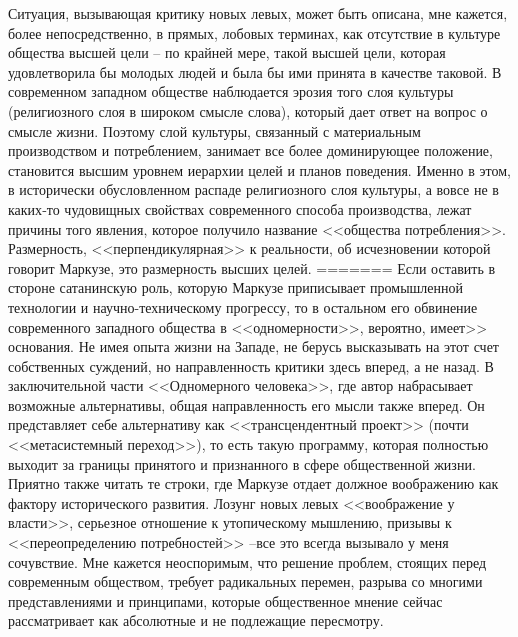 \documentclass{book}
\begin{document}
{Ситуация, вызывающая критику новых левых, может быть описана, мне кажется, более непосредственно, в прямых, лобо­вых терминах, как отсутствие в культуре общества высшей це­ли -- по крайней мере, такой высшей цели, которая удовлетво­рила бы молодых людей и была бы ими принята в качестве та­ковой. В современном западном обществе наблюдается эрозия того слоя культуры (религиозного  слоя в широком смысле слова), который дает ответ на вопрос о смысле жизни. Поэто­му слой культуры, связанный с материальным производством и потреблением, занимает все более доминирующее положение, становится высшим уровнем иерархии целей и планов поведе­ния. Именно в этом, в исторически обусловленном распаде ре­лигиозного слоя культуры, а вовсе не в каких‑то чудовищных свойствах современного способа производства, лежат причины того явления, которое получило название <<общества потребле­ния>>. Размерность, <<перпендикулярная>> к реальности, об исчез­новении которой говорит Маркузе, это размерность высших целей.
=======
Если оставить в стороне сатанинскую роль, которую Маркузе приписывает промышленной технологии и научно-техниче­скому прогрессу, то в остальном его обвинение современного западного общества в <<одномерности>>, вероятно, имеет>> осно­вания. Не имея опыта жизни на Западе, не берусь высказывать на этот счет собственных суждений, но направленность критики здесь вперед, а не назад. В заключительной части <<Одномерно­го человека>>, где автор набрасывает возможные альтернативы, общая направленность его мысли также вперед. Он представ­ляет себе альтернативу как <<трансцендентный проект>> (почти <<метасистемный переход>>), то есть такую программу, кото­рая полностью выходит за границы принятого и признанного в сфере общественной жизни. Приятно также читать те строки, где Маркузе отдает должное воображению как фактору исто­рического развития. Лозунг новых левых <<воображение у власти>>, серьезное отношение к утопическому мышлению, призывы к <<переопределению потребностей>> --все это всегда вызывало у меня сочувствие. Мне кажется 
неоспоримым, что решение проблем, стоящих перед современным обществом, требует радикальных перемен, разрыва со многими представ­лениями и принципами, которые общественное мнение сейчас рассматривает как абсолютные и не подлежащие пересмотру.

}
\end{document}
